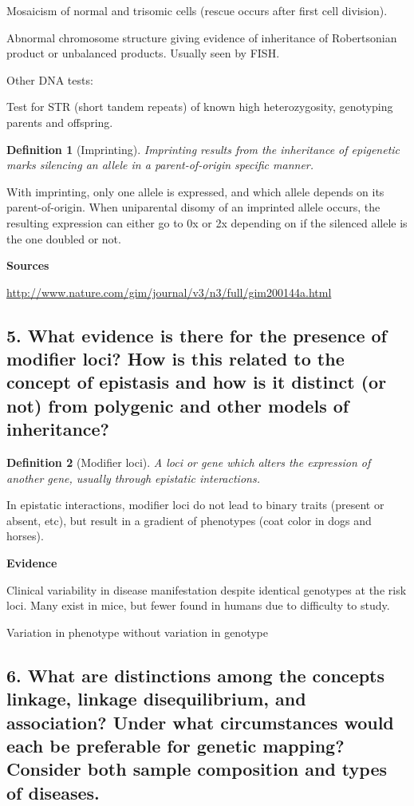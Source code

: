 \documentclass{tufte-handout}
\theoremstyle{noparens}
\newtheorem*{define}{Definition}
\begin{document}
 Mosaicism of normal and trisomic cells (rescue occurs after first cell division).
 
 Abnormal chromosome structure giving evidence of inheritance of Robertsonian product or unbalanced products. Usually seen by FISH.
 
 Other DNA tests:
 
 Test for STR (short tandem repeats) of known high heterozygosity, genotyping parents and offspring. 

\begin{define}[Imprinting]
Imprinting results from the inheritance of epigenetic marks silencing an allele in a parent-of-origin specific manner.
\end{define}

With imprinting, only one allele is expressed, and which allele depends on its parent-of-origin. When uniparental disomy of an imprinted allele occurs, the resulting expression can either go to 0x or 2x depending on if the silenced allele is the one doubled or not.

 \textbf{Sources}
 
 \url{http://www.nature.com/gim/journal/v3/n3/full/gim200144a.html}
 
\newpage
\subsection{5.
What evidence is there for the presence of modifier loci? How is this related to the concept of epistasis and how is it distinct (or not) from polygenic and other models of inheritance?}
\label{subsec:05}

\begin{define}[Modifier loci]
A loci or gene which alters the expression of another gene, usually through epistatic interactions.
\end{define}

In epistatic interactions, modifier loci do not lead to binary traits (present or absent, etc), but result in a gradient of phenotypes (coat color in dogs and horses).

\noindent
\textbf{Evidence}

Clinical variability in disease manifestation despite identical genotypes at the risk loci. Many exist in mice, but fewer found in humans due to difficulty to study.

Variation in phenotype without variation in genotype 
\newpage
\subsection{6.
What are distinctions among the concepts linkage, linkage disequilibrium, and association? Under what circumstances would each be preferable for genetic mapping? Consider both sample composition and types of diseases.}
\label{subsec:06}
\end{document}
